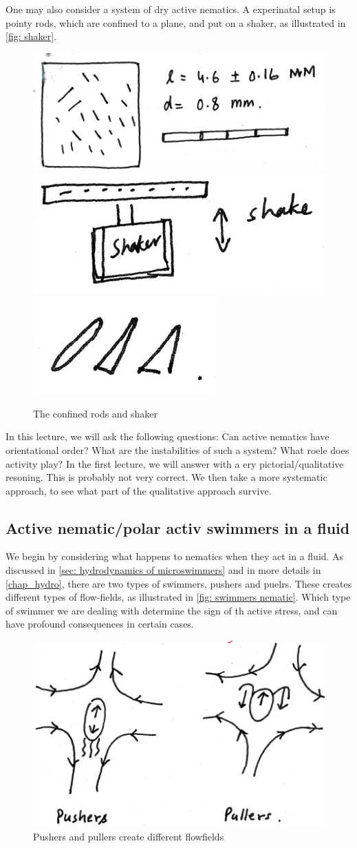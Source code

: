 One may also consider a system of dry active nematics.
A experinatal setup is pointy rods, which are confined to a plane, and put on a shaker, as illustrated in \autoref{fig: shaker}.

\begin{figure}[!htb]
    \centering
    \includegraphics[width=.4\textwidth]{chapters/Figures/nematics/plate.png}
    \includegraphics[width=.4\textwidth]{chapters/Figures/nematics/shaker.png}
    \includegraphics[width=.1\textwidth]{chapters/Figures/nematics/rods.png}
    \caption{The confined rods and shaker}
    \label{fig: shaker}
\end{figure}

In this lecture, we will ask the following questions:
Can active nematics have orientational order? 
What are the instabilities of such a system?
What roele does activity play?
In the first lecture, we will answer with a ery pictorial/qualitative resoning.
This is probably not very correct.
We then take a more systematic approach, to see what part of the qualitative approach survive.

\subsection*{Active nematic/polar activ swimmers in a fluid}

We begin by considering what happens to nematics when they act in a fluid.
As discussed in \autoref{sec: hydrodynamics of microswimmers} and in more details in \autoref{chap_hydro}, there are two types of swimmers, pushers and puelrs.
These creates different types of flow-fields, as illustrated in \autoref{fig: swimmers nematic}.
Which type of swimmer we are dealing with determine the sign of th active stress, and can have profound consequences in certain cases.

\begin{figure}[!htb]
    \centering
    \includegraphics[width=.25\textwidth]{chapters/Figures/nematics/swimmers.png}
    \caption{Pushers and pullers create different flowfields}
    \label{fig: swimmers nematic}
\end{figure}

